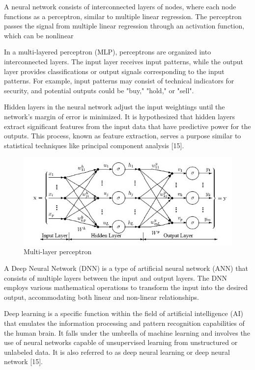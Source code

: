 A neural network consists of interconnected layers of nodes, where each node functions as a perceptron, similar to multiple linear regression. The perceptron passes the signal from multiple linear regression through an activation function, which can be nonlinear

In a multi-layered perceptron (MLP), perceptrons are organized into interconnected layers. The input layer receives input patterns, while the output layer provides classifications or output signals corresponding to the input patterns. 
For example, input patterns may consist of technical indicators for security, and potential outputs could be "buy," "hold," or "sell".

Hidden layers in the neural network adjust the input weightings until the network's margin of error is minimized. It is hypothesized that hidden layers extract significant features from the input data that have predictive power for the outputs. This process, known as feature extraction, serves a purpose similar to statistical techniques like principal component analysis [15].
\begin{center}
    \begin{figure}[!htp]
        \centering
        \includegraphics[width=0.8 \textwidth]{image/MLFN_with_weights.jpeg}
        \caption{Multi-layer perceptron}
        \label{subsection}
    \end{figure}
    \end{center}

A Deep Neural Network (DNN) is a type of artificial neural network (ANN) that consists of multiple layers between the input and output layers. The DNN employs various mathematical operations to transform the input into the desired output, accommodating both linear and non-linear relationships.

Deep learning is a specific function within the field of artificial intelligence (AI) that emulates the information processing and pattern recognition capabilities of the human brain. It falls under the umbrella of machine learning and involves the use of neural networks capable of unsupervised learning from unstructured or unlabeled data. It is also referred to as deep neural learning or deep neural network [15].

